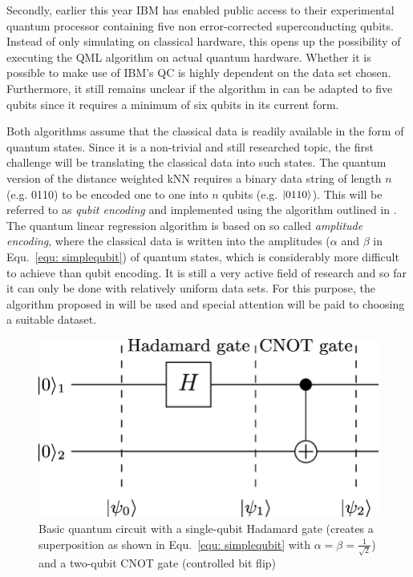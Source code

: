 \documentclass[a4paper]{article}
\newcommand*{\0}{$\ket{0}$}
\newcommand*{\1}{$\ket{1}$}
\begin{document}
Secondly, earlier this year IBM has enabled public access to their experimental quantum processor containing five non error-corrected superconducting qubits. Instead of only simulating on classical hardware, this opens up the possibility of executing the QML algorithm on actual quantum hardware. Whether it is possible to make use of IBM's QC is highly dependent on the data set chosen. Furthermore, it still remains unclear if the algorithm in \cite{Schuld2016} can be adapted to five qubits since it requires a minimum of six qubits in its current form.

Both algorithms assume that the classical data is readily available in the form of quantum states. Since it is a non-trivial and still researched topic, the first challenge will be translating the classical data into such states. The quantum version of the distance weighted kNN requires a binary data string of length $n$ (e.g. 0110) to be encoded one to one into $n$ qubits (e.g. $\ket{0110}$). This will be referred to as \textit{qubit encoding} and implemented using the algorithm outlined in \cite{ventura1999initializing}.
The quantum linear regression algorithm is based on so called \textit{amplitude encoding}, where the classical data is written into the amplitudes ($\alpha$ and $\beta$ in Equ.~\ref{equ: simplequbit}) of quantum states, which is considerably more difficult to achieve than qubit encoding. It is still a very active field of research and so far it can only be done with relatively uniform data sets. For this purpose, the algorithm proposed in \cite{grover2002creating} will be used and special attention will be paid to choosing a suitable dataset.

\begin{figure}[!ht]
      \centering
       \includegraphics[scale=0.25]{qcircuit.png}
       \caption[caption for qcircuit]{\label{fig:qcircuit} Basic quantum circuit with a single-qubit Hadamard gate (creates a superposition as shown in Equ.~\ref{equ: simplequbit} with $\alpha=\beta=\frac{1}{\sqrt{2}}$) and a two-qubit CNOT gate (controlled bit flip)\footnotemark[2]}
\end{figure}
\end{document}
